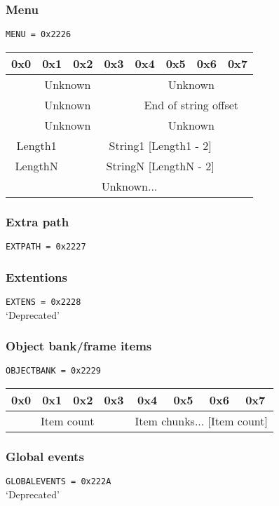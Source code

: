 \documentclass{article}
\begin{document}
\subsubsection{Menu}
\verb|MENU = 0x2226|
\\
\begin{tabular}{c|c|c|c|c|c|c|c}
  0x0 & 0x1 & 0x2 & 0x3 & 0x4 & 0x5 & 0x6 & 0x7
  \\ \hline
  \multicolumn{4}{|c|}{Unknown} &
  \multicolumn{4}{|c|}{Unknown}
  \\ \hline
  \multicolumn{4}{|c|}{Unknown} &
  \multicolumn{4}{|c|}{End of string offset}
  \\ \hline
  \multicolumn{4}{|c|}{Unknown} &
  \multicolumn{4}{|c|}{Unknown}
  \\ \hline
  \multicolumn{2}{|c|}{Length1} &
  \multicolumn{6}{|c}{String1 [Length1 - 2]}
  \\ \hline \hline
  \multicolumn{2}{|c|}{LengthN} &
  \multicolumn{6}{|c}{StringN [LengthN - 2]}
  \\ \hline
  \multicolumn{8}{|c}{Unknown...}
  \\ \hline
\end{tabular}

\subsubsection{Extra path}
\verb|EXTPATH = 0x2227|

\subsubsection{Extentions}
\verb|EXTENS = 0x2228|
\\
`Deprecated'

\subsubsection{Object bank/frame items}
\verb|OBJECTBANK = 0x2229|
\\
\begin{tabular}{c|c|c|c|c|c|c|c}
  0x0 & 0x1 & 0x2 & 0x3 & 0x4 & 0x5 & 0x6 & 0x7
  \\ \hline
  \multicolumn{4}{|c|}{Item count} &
  \multicolumn{4}{|c}{Item chunks... [Item count]}
  \\ \hline
\end{tabular}


\subsubsection{Global events}
\verb|GLOBALEVENTS = 0x222A|
\\
`Deprecated'
\end{document}
